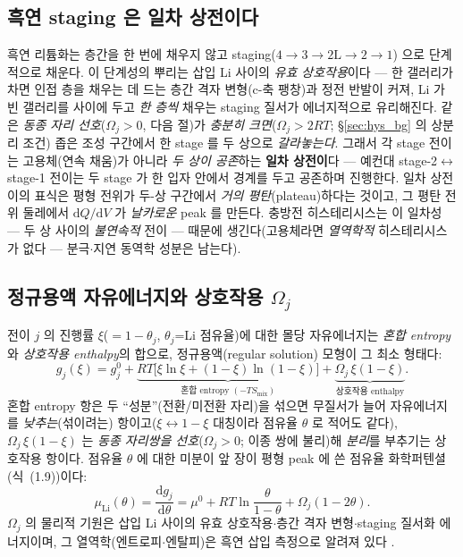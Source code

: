 \documentclass[11pt,a4paper]{article}
\newcommand{\dd}{\mathrm{d}}
\begin{document}
\subsection{흑연 staging 은 일차 상전이다}
흑연 리튬화는 층간을 한 번에 채우지 않고 staging($4\to3\to2\mathrm L\to2\to1$) 으로 단계적으로 채운다. 이
단계성의 뿌리는 삽입 Li 사이의 \emph{유효 상호작용}이다 — 한 갤러리가 차면 인접 층을 채우는 데 드는 층간 격자
변형(c-축 팽창)과 정전 반발이 커져, Li 가 빈 갤러리를 사이에 두고 \emph{한 층씩} 채우는 staging 질서가
에너지적으로 유리해진다. 같은 \emph{동종 자리 선호}($\Omega_j>0$, 다음 절)가 \emph{충분히 크면}($\Omega_j>2RT$; \S\ref{sec:hys_bg} 의
상분리 조건) 좁은 조성 구간에서 한 stage 를 두 상으로 \emph{갈라놓는다}. 그래서 각 stage 전이는 고용체(연속 채움)가 아니라 \emph{두 상이 공존}하는
\textbf{일차 상전이}다 — 예컨대 stage-2$\leftrightarrow$stage-1 전이는 두 stage 가 한 입자 안에서 경계를 두고
공존하며 진행한다. 일차 상전이의 표식은 평형 전위가 두-상
구간에서 \emph{거의 평탄}(plateau)하다는 것이고, 그 평탄 전위 둘레에서 $\dd Q/\dd V$ 가 \emph{날카로운} peak 를
만든다. 충방전 히스테리시스는 이 일차성 — 두 상 사이의 \emph{불연속적} 전이 — 때문에 생긴다(고용체라면
\emph{열역학적} 히스테리시스가 없다 — 분극$\cdot$지연 동역학 성분은 남는다).

\subsection{정규용액 자유에너지와 상호작용 $\Omega_j$}
전이 $j$ 의 진행률 $\xi$($=1-\theta_j$, $\theta_j$=Li 점유율)에 대한 몰당 자유에너지는 \emph{혼합 entropy}와
\emph{상호작용 enthalpy}의 합으로, 정규용액(regular solution) 모형이 그 최소 형태다:
\begin{equation}
g_j(\xi)=g_j^0+\underbrace{RT\big[\xi\ln\xi+(1-\xi)\ln(1-\xi)\big]}_{\text{혼합 entropy }(-TS_\mathrm{mix})}
+\underbrace{\Omega_j\,\xi(1-\xi)}_{\text{상호작용 enthalpy}}.
\label{eq:hys_g}
\end{equation}
혼합 entropy 항은 두 ``성분''(전환/미전환 자리)을 섞으면 무질서가 늘어 자유에너지를 \emph{낮추는}(섞이려는)
항이고($\xi\leftrightarrow1-\xi$ 대칭이라 점유율 $\theta$ 로 적어도 같다), $\Omega_j\,\xi(1-\xi)$ 는 \emph{동종
자리쌍을 선호}($\Omega_j>0$; 이종 쌍에 불리)해 \emph{분리}를 부추기는 상호작용 항이다. 점유율 $\theta$ 에 대한
미분이 앞 장이 평형 peak 에 쓴 점유율 화학퍼텐셜(식~(1.9))이다:
\begin{equation}
\mu_\mathrm{Li}(\theta)=\frac{\dd g_j}{\dd\theta}=\mu^0+RT\ln\frac{\theta}{1-\theta}+\Omega_j(1-2\theta).
\label{eq:hys_mu}
\end{equation}
$\Omega_j$ 의 물리적 기원은 삽입 Li 사이의 유효 상호작용$\cdot$층간 격자 변형$\cdot$staging 질서화 에너지이며, 그
열역학(엔트로피$\cdot$엔탈피)은 흑연 삽입 측정으로 알려져 있다 \cite{reynier2004}.
\end{document}
